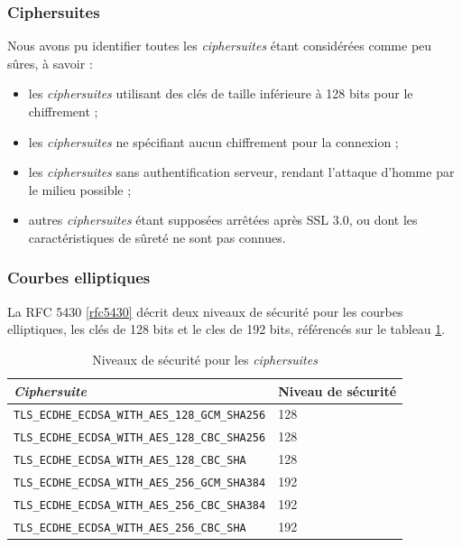 \subsubsection{Ciphersuites}
Nous avons pu identifier toutes les \textit{ciphersuites} étant considérées comme peu sûres, à savoir :
\begin{itemize}
\item les \textit{ciphersuites} utilisant des clés de taille inférieure à 128 bits pour le chiffrement ;
\item les \textit{ciphersuites} ne spécifiant aucun chiffrement pour la connexion ; 
\item les \textit{ciphersuites} sans authentification serveur, rendant l'attaque d'homme par le milieu possible ;
\item autres \textit{ciphersuites} étant supposées arrêtées après SSL 3.0, ou dont les caractéristiques de sûreté ne sont pas connues.
\end{itemize}


\subsubsection{Courbes elliptiques}
La RFC 5430 \ref{rfc5430} décrit deux niveaux de sécurité pour les courbes elliptiques, les clés de 128 bits et le cles de 192 bits, référencés sur le tableau \ref{ciphsuiteSec}. 

\begin{table}[H]
\centering

\begin{tabularx}{13cm}{|l|X|}
\hline
\textbf{\textit{Ciphersuite}} & \textbf{Niveau de sécurité} \\
\hline
\verb+TLS_ECDHE_ECDSA_WITH_AES_128_GCM_SHA256+ & 128\\
\verb+TLS_ECDHE_ECDSA_WITH_AES_128_CBC_SHA256+ & 128\\            
\verb+TLS_ECDHE_ECDSA_WITH_AES_128_CBC_SHA+    & 128\\            
\verb+TLS_ECDHE_ECDSA_WITH_AES_256_GCM_SHA384+ & 192\\            
\verb+TLS_ECDHE_ECDSA_WITH_AES_256_CBC_SHA384+ & 192\\            
\verb+TLS_ECDHE_ECDSA_WITH_AES_256_CBC_SHA+    & 192\\
\hline
\end{tabularx}

\caption{Niveaux de sécurité pour les \textit{ciphersuites}}
\label{ciphsuiteSec}
\end{table}


